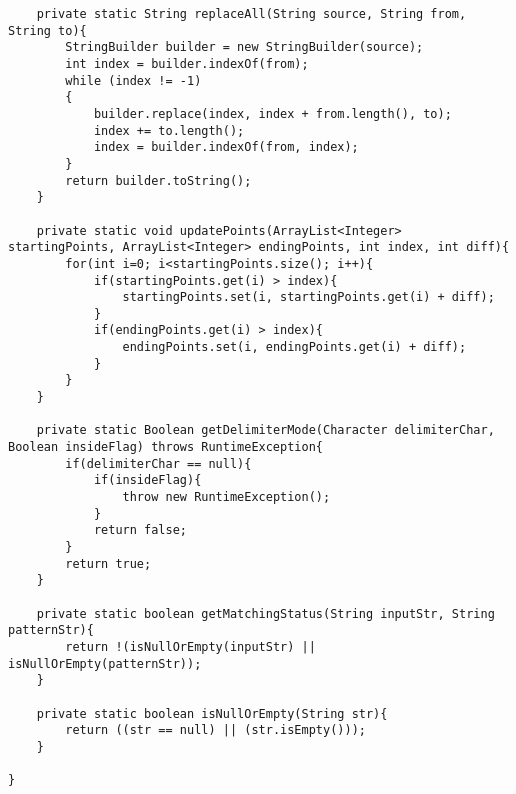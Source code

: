 \documentclass{article}
\begin{document}
\begin{lstlisting}
    private static String replaceAll(String source, String from, String to){
        StringBuilder builder = new StringBuilder(source);
        int index = builder.indexOf(from);
        while (index != -1)
        {
            builder.replace(index, index + from.length(), to);
            index += to.length();
            index = builder.indexOf(from, index);
        }
        return builder.toString();
    }

    private static void updatePoints(ArrayList<Integer> startingPoints, ArrayList<Integer> endingPoints, int index, int diff){
        for(int i=0; i<startingPoints.size(); i++){
            if(startingPoints.get(i) > index){
                startingPoints.set(i, startingPoints.get(i) + diff);
            }
            if(endingPoints.get(i) > index){
                endingPoints.set(i, endingPoints.get(i) + diff);
            }
        }
    }

    private static Boolean getDelimiterMode(Character delimiterChar, Boolean insideFlag) throws RuntimeException{
        if(delimiterChar == null){
            if(insideFlag){
                throw new RuntimeException();
            }
            return false;
        }
        return true;
    }

    private static boolean getMatchingStatus(String inputStr, String patternStr){
        return !(isNullOrEmpty(inputStr) || isNullOrEmpty(patternStr));
    }

    private static boolean isNullOrEmpty(String str){
        return ((str == null) || (str.isEmpty()));
    }

}
\end{lstlisting}
\end{document}
